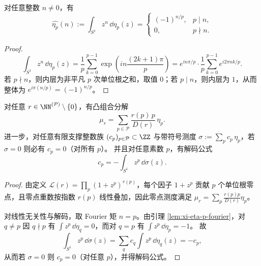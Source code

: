 \begin{lemma}\label{lem:xi-eta-p-fourier}
对任意整数 \(n\neq 0\)，有
\[
\widehat{\eta_p}(n):=\int_{S^1}z^n\,\dd\eta_p(z)=
\begin{cases}
(-1)^{n/p},&p\mid n,\\
0,&p\nmid n.
\end{cases}
\]
\end{lemma}
\begin{proof}
\[
\int_{S^1}z^n\,\dd\eta_p(z)
=\frac1p\sum_{k=0}^{p-1}\exp\!\left(i n\frac{(2k+1)\pi}{p}\right)
=e^{i n\pi/p}\cdot \frac1p\sum_{k=0}^{p-1}e^{i2\pi nk/p}.
\]
若 \(p\nmid n\)，则内层为非平凡 \(p\) 次单位根之和，取值 \(0\)；若 \(p\mid n\)，则内层为 \(1\)，从而整体为 \(e^{i\pi(n/p)}=(-1)^{n/p}\)。
\end{proof}

\begin{proposition}[零点测度的素数分解与单频谱解码]\label{prop:xi-leyang-prime-measure-linear-independence-decoding}
对任意 \(r\in\NN^{(\mathcal P)}\setminus\{0\}\)，有凸组合分解
\[
\mu_r=\sum_{p\in\mathcal P}\frac{r(p)\,p}{D(r)}\,\eta_p.
\]
进一步，对任意有限支撑整数族 \((c_p)_{p\in\mathcal P}\subset\ZZ\) 与带符号测度
\(
\sigma:=\sum_pc_p\,\eta_p
\)，若 \(\sigma=0\) 则必有 \(c_p=0\)（对所有 \(p\)）。
并且对任意素数 \(p\)，有解码公式
\[
c_p=-\int_{S^1}z^p\,\dd\sigma(z).
\]
\end{proposition}
\begin{proof}
由定义 \(\mathcal L(r)=\prod_p(1+z^p)^{r(p)}\)，每个因子 \(1+z^p\) 贡献 \(p\) 个单位根零点，且零点重数按指数 \(r(p)\) 线性叠加，因此零点测度满足
\(
\mu_r=\sum_p\frac{r(p)p}{D(r)}\eta_p
\)。
\par
对线性无关性与解码，取 Fourier 矩 \(n=p\)。由引理 \ref{lem:xi-eta-p-fourier}，对 \(q\neq p\) 因 \(q\nmid p\) 有
\(
\int z^p\,\dd\eta_q=0
\)，而对 \(q=p\) 有
\(
\int z^p\,\dd\eta_p=-1
\)。
故
\[
\int_{S^1}z^p\,\dd\sigma(z)=\sum_q c_q\int z^p\,\dd\eta_q(z)=-c_p,
\]
从而若 \(\sigma=0\) 则 \(c_p=0\)（对任意 \(p\)），并得解码公式。
\end{proof}

